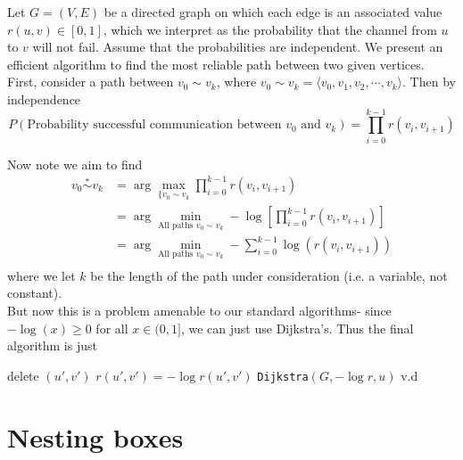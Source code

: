 \documentclass[paper=a4, fontsize=11pt]{scrartcl} %
\numberwithin{equation}{section} %
\numberwithin{figure}{section} %
\numberwithin{table}{section} %
\begin{document}
Let $G = (V,E)$ be a directed graph on which each edge is an associated value $r(u,v) \in [0,1]$, which we interpret as the probability that the channel from $u$ to $v$ will not fail. Assume that the probabilities are independent. We present an efficient algorithm to find the most reliable path between two given vertices.\\

First, consider a path between $v_0 \sim v_k$, where $v_0 \sim v_k = \langle v_0, v_1, v_2, \cdots, v_k \rangle$. Then by independence
\[P(\textrm{Probability successful communication between } v_0 \textrm{ and } v_k) = \prod_{i = 0}^{k-1} r(v_i, v_{i+1})\]

Now note we aim to find
\begin{align*}
v_0 \stackrel{*}{\sim}v_k &= \arg \max_{\{v_0 \sim v_k} \prod_{i = 0}^{k - 1} r(v_i, v_{i+1}) \\
	 &= \arg \min_{\textrm{All paths }v_0 \sim v_k} - \log[\prod_{i = 0}^{k - 1} r(v_i, v_{i+1})] \\
	 &= \arg \min_{\textrm{All paths }v_0 \sim v_k} - \sum_{i = 0}^{k - 1}\log\left(r(v_i, v_{i+1})\right) \\
\end{align*}
where we let $k$ be the length of the path under consideration (i.e. a variable, not constant). \\

But now this is a problem amenable to our standard algorithms- since $-\log(x) \geq 0$ for all $x \in (0, 1]$, we can just use Dijkstra's. Thus the final algorithm is just\\

\begin{algorithmic}
			\State delete $(u',v')$ 
		\Else
			\State $r(u',v') = -\log r(u',v')$
		\EndIf
	\EndFor
	\State \texttt{Dijkstra}$(G, -\log r, u)$
	\State \Return v.d
\EndFunction
\end{algorithmic}


\section{Nesting boxes}
\end{document}
